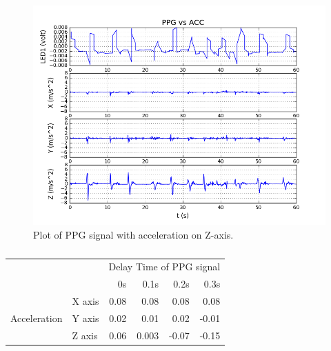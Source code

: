 \documentclass[11pt, draftclsnofoot, onecolumn]{IEEEtran}
\begin{document}
    \begin{figure}[h]	
        \centering
        \includegraphics[scale=0.50]{z_acc_ppg_acc_12} 
        \caption{Plot of PPG signal with acceleration on Z-axis.}
        \label{fig:Z_AccPPG}
    \end{figure}
    
    \begin{table}[ht]
	\centering
        \caption{}
		\label{table:Z_AccPPG}
		\begin{tabular}{ l l|r|r|r|r| }
			\cline{3-6}
            & & \multicolumn{4}{|c|}{Delay Time of PPG signal} \\
            \cline{3-6}
            	& & 0s & 0.1s & 0.2s & 0.3s  \\
			\hline
            \multicolumn{1}{|c|}{\multirow{3}{*}{Acceleration}} 
            	& X axis & 0.08  & 0.08  & 0.08  &  0.08  \\
            \cline{2-6}
            \multicolumn{1}{|c|}{} 
            	& Y axis & 0.02  & 0.01  & 0.02 & -0.01  \\
            \cline{2-6}
            \multicolumn{1}{|c|}{} 
            	& Z axis & 0.06  & 0.003 & -0.07 & -0.15  \\
			\hline
		\end{tabular}
	\end{table}
    
\end{document}
